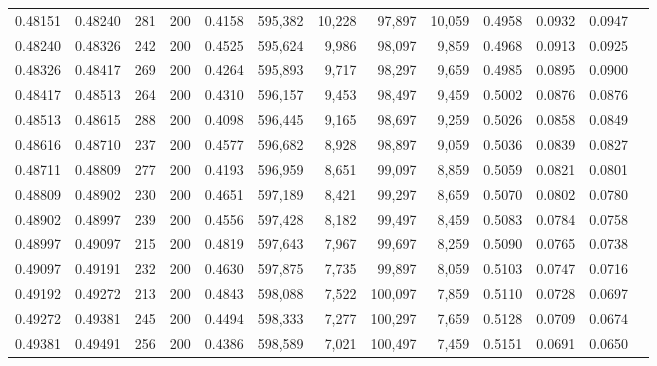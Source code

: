 \begin{tabular}{rrrrrrrrrrrrr}
0.48151 & 0.48240 &   281 & 200 &                                     0.4158 & 595,382 &  10,228 &  97,897 &  10,059 & 0.4958 & 0.0932 & 0.0947 \\
0.48240 & 0.48326 &   242 & 200 &                                     0.4525 & 595,624 &   9,986 &  98,097 &   9,859 & 0.4968 & 0.0913 & 0.0925 \\
0.48326 & 0.48417 &   269 & 200 &                                     0.4264 & 595,893 &   9,717 &  98,297 &   9,659 & 0.4985 & 0.0895 & 0.0900 \\
0.48417 & 0.48513 &   264 & 200 &                                     0.4310 & 596,157 &   9,453 &  98,497 &   9,459 & 0.5002 & 0.0876 & 0.0876 \\
0.48513 & 0.48615 &   288 & 200 &                                     0.4098 & 596,445 &   9,165 &  98,697 &   9,259 & 0.5026 & 0.0858 & 0.0849 \\
0.48616 & 0.48710 &   237 & 200 &                                     0.4577 & 596,682 &   8,928 &  98,897 &   9,059 & 0.5036 & 0.0839 & 0.0827 \\
0.48711 & 0.48809 &   277 & 200 &                                     0.4193 & 596,959 &   8,651 &  99,097 &   8,859 & 0.5059 & 0.0821 & 0.0801 \\
0.48809 & 0.48902 &   230 & 200 &                                     0.4651 & 597,189 &   8,421 &  99,297 &   8,659 & 0.5070 & 0.0802 & 0.0780 \\
0.48902 & 0.48997 &   239 & 200 &                                     0.4556 & 597,428 &   8,182 &  99,497 &   8,459 & 0.5083 & 0.0784 & 0.0758 \\
0.48997 & 0.49097 &   215 & 200 &                                     0.4819 & 597,643 &   7,967 &  99,697 &   8,259 & 0.5090 & 0.0765 & 0.0738 \\
0.49097 & 0.49191 &   232 & 200 &                                     0.4630 & 597,875 &   7,735 &  99,897 &   8,059 & 0.5103 & 0.0747 & 0.0716 \\
0.49192 & 0.49272 &   213 & 200 &                                     0.4843 & 598,088 &   7,522 & 100,097 &   7,859 & 0.5110 & 0.0728 & 0.0697 \\
0.49272 & 0.49381 &   245 & 200 &                                     0.4494 & 598,333 &   7,277 & 100,297 &   7,659 & 0.5128 & 0.0709 & 0.0674 \\
0.49381 & 0.49491 &   256 & 200 &                                     0.4386 & 598,589 &   7,021 & 100,497 &   7,459 & 0.5151 & 0.0691 & 0.0650 \\

\end{tabular}

